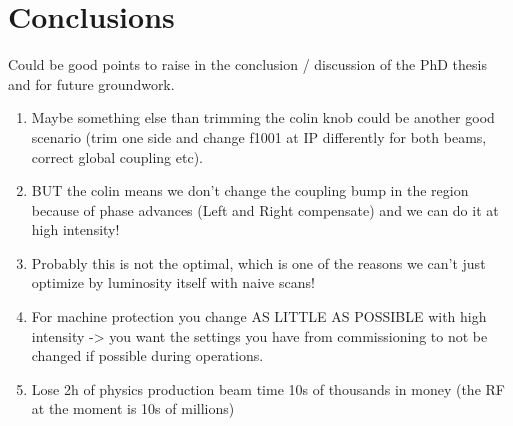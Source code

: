 \chapter{Conclusions}
\label{chapter:conclusion} %


Could be good points to raise in the conclusion / discussion of the PhD thesis and for future groundwork.

\begin{enumerate}
    \item Maybe something else than trimming the colin knob could be another good scenario (trim one side and change f1001 at IP differently for both beams, correct global coupling etc).
    \item BUT the colin means we don't change the coupling bump in the region because of phase advances (Left and Right compensate) and we can do it at high intensity!
    \item Probably this is not the optimal, which is one of the reasons we can't just optimize by luminosity itself with naive scans!
    \item For machine protection you change AS LITTLE AS POSSIBLE with high intensity -> you want the settings you have from commissioning to not be changed if possible during operations.
    \item Lose 2h of physics production beam time 10s of thousands in money (the RF at the moment is 10s of millions)
\end{enumerate}

